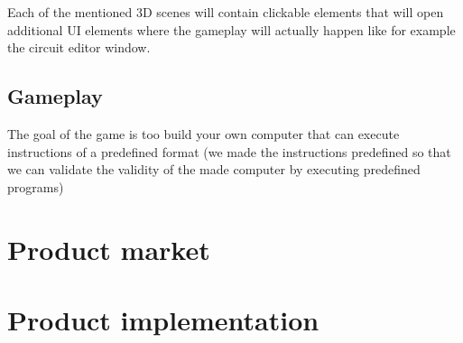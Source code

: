 \documentclass[12pt]{article}
\begin{document}
Each of the mentioned 3D scenes will contain clickable elements that will open additional UI elements where the gameplay will actually happen 
like for example the circuit editor window.

\subsection{Gameplay}
The goal of the game is too build your own computer that can execute instructions of a predefined format (we made the instructions 
predefined so that we can validate the validity of the made computer by executing predefined programs)







\section{Product market}
\section{Product implementation}
\end{document}
